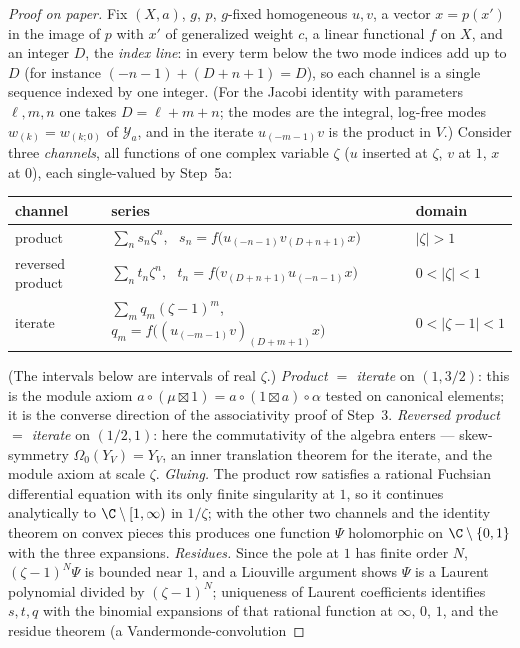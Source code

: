 \begin{proof}[Proof on paper]
Fix $(X,a)$, $g$, $p$, $g$-fixed homogeneous $u,v$, a vector $x=p(x')$ in the image of $p$ with $x'$ of generalized
weight $c$, a linear functional $f$ on $X$, and an integer $D$, the \emph{index line}: in every term below the two mode
indices add up to $D$ (for instance $(-n-1)+(D+n+1)=D$), so each channel is a single sequence indexed by one integer.
(For the Jacobi identity with parameters $\ell,m,n$ one takes $D=\ell+m+n$; the modes are the integral, log-free modes
$w_{(k)}=w_{(k;0)}$ of $\mathcal Y_a$, and in the iterate $u_{(-m-1)}v$ is the product in $V$.) Consider three
\emph{channels}, all functions of one complex variable $\zeta$ ($u$ inserted at $\zeta$, $v$ at $1$, $x$ at $0$), each
single-valued by Step~5a:
\begin{center}\small
\begin{tabular}{lll}
channel & series & domain\\\hline
product & $\sum_n s_n\zeta^n$, \ $s_n=f\big(u_{(-n-1)}v_{(D+n+1)}x\big)$ & $|\zeta|>1$\\
reversed product & $\sum_n t_n\zeta^n$, \ $t_n=f\big(v_{(D+n+1)}u_{(-n-1)}x\big)$ & $0<|\zeta|<1$\\
iterate & $\sum_m q_m(\zeta-1)^m$, \ $q_m=f\big((u_{(-m-1)}v)_{(D+m+1)}x\big)$ & $0<|\zeta-1|<1$
\end{tabular}
\end{center}
(The intervals below are intervals of real $\zeta$.) \emph{Product $=$ iterate} on $(1,3/2)$: this is the module axiom $a\circ(\mu\boxtimes1)=a\circ(1\boxtimes a)\circ\alpha$
tested on canonical elements; it is the converse direction of the associativity proof of Step~3. \emph{Reversed product
$=$ iterate} on $(1/2,1)$: here the commutativity of the algebra enters --- skew-symmetry $\Omega_0(Y_V)=Y_V$, an inner
translation theorem for the iterate, and the module axiom at scale $\zeta$. \emph{Gluing.} The product row satisfies a
rational Fuchsian differential equation with its only finite singularity at $1$, so it continues analytically to
$\C\setminus[1,\infty)$ in $1/\zeta$; with the other two channels and the identity theorem on convex pieces this produces
one function $\Psi$ holomorphic on $\C\setminus\{0,1\}$ with the three expansions. \emph{Residues.} Since the pole at
$1$ has finite order $N$, $(\zeta-1)^N\Psi$ is bounded near $1$, and a Liouville argument shows $\Psi$ is a Laurent
polynomial divided by $(\zeta-1)^N$; uniqueness of Laurent coefficients identifies $s,t,q$ with the binomial
expansions of that rational function at $\infty$, $0$, $1$, and the residue theorem (a Vandermonde-convolution

\end{proof}

